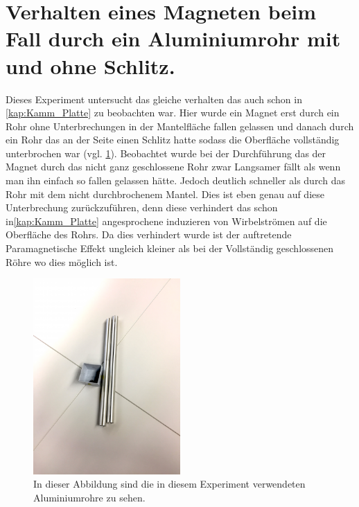 \section{Verhalten eines Magneten beim Fall durch ein Aluminiumrohr mit und ohne Schlitz.}

Dieses Experiment untersucht das gleiche verhalten das auch schon in \cref{kap:Kamm_Platte} zu beobachten war.
Hier wurde ein Magnet erst durch ein Rohr ohne Unterbrechungen in der Mantelfläche fallen gelassen und danach durch ein Rohr das an der Seite einen Schlitz hatte sodass die Oberfläche vollständig unterbrochen war (vgl. \cref{fig:Rohr}).
Beobachtet wurde bei der Durchführung das der Magnet durch das nicht ganz geschlossene Rohr zwar Langsamer fällt als wenn man ihn einfach so fallen gelassen hätte. Jedoch deutlich schneller als durch das Rohr mit dem nicht durchbrochenem Mantel. Dies ist eben genau auf diese Unterbrechung zurückzuführen, denn diese verhindert das schon in\cref{kap:Kamm_Platte} angesprochene induzieren von Wirbelströmen auf die Oberfläche des Rohrs. Da dies verhindert wurde ist der auftretende Paramagnetische Effekt ungleich kleiner als bei der Vollständig geschlossenen Röhre wo dies möglich ist. 
\begin{figure}[h]
	\includegraphics[width=0.5\textwidth]{res/Rohr.png}
	\caption{In dieser Abbildung sind die in diesem Experiment verwendeten Aluminiumrohre zu sehen\protect\footnotemark.}
	\label{fig:Rohr}
\end{figure}
